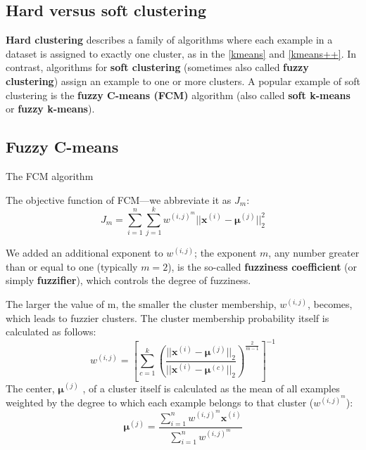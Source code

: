 \subsection{Hard versus soft clustering}
\textbf{Hard clustering} describes a family of algorithms where each example in a dataset is assigned to exactly one cluster, as in the \autoref{kmeans} and \autoref{kmeans++}. In contrast, algorithms for \textbf{soft clustering} (sometimes also called \textbf{fuzzy clustering}) assign an example to one or more clusters. A popular example of soft clustering is the \textbf{fuzzy C-means (FCM)} algorithm (also called \textbf{soft k-means} or \textbf{fuzzy k-means}).
\subsection{Fuzzy C-means}
\begin{algorithm}
    \caption{The FCM algorithm\label{fcm}}
\end{algorithm}

The objective function of FCM—we abbreviate it as $J_m$:
\begin{equation}
    J_m=\sum_{i=1}^{n}\sum_{j=1}^{k}w^{(i,j)^m}||\bm{x}^{(i)}-\bm{\mu}^{(j)}||_2^2
\end{equation}

We added an additional exponent to $w^{(i,j)}$; the exponent $m$, any number greater than or equal to one (typically $m = 2$), is the so-called \textbf{fuzziness coefficient} (or simply \textbf{fuzzifier}), which controls the degree of fuzziness.

The larger the value of m, the smaller the cluster membership, $w^{(i,j)}$, becomes, which leads to fuzzier clusters. The cluster membership probability itself is calculated as follows:
\begin{equation}
    w^{(i,j)}=\left[\sum_{c=1}^{k}\left(\frac{||\bm{x}^{(i)}-\bm{\mu}^{(j)}||_2}{||\bm{x}^{(i)}-\bm{\mu}^{(c)}||_2}\right)^{\frac{2}{m-1}}\right]^{-1}
\end{equation}
The center, $\bm{\mu}^{(j)}$ , of a cluster itself is calculated as the mean of all examples weighted by the degree to
which each example belongs to that cluster ($w^{(i,j)^m}$):
\begin{equation}
    \bm{\mu}^{(j)}=\frac{\sum_{i=1}^{n}w^{(i,j)^m}\bm{x}^{(i)}}{\sum_{i=1}^{n}w^{(i,j)^m}}
\end{equation}

